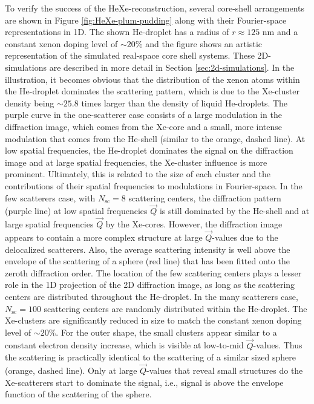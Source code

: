 To verify the success of the HeXe-reconstruction, several core-shell arrangements are shown in Figure \ref{fig:HeXe-plum-pudding} along with their Fourier-space representations in 1D. The shown He-droplet has a radius of $r\approx 125$ nm and a constant xenon doping level of $\sim 20\%$ and the figure shows an artistic representation of the simulated real-space core shell systems. These 2D-simulations are described in more detail in Section \ref{sec:2d-simulations}. In the illustration, it becomes obvious that the distribution of the xenon atoms within the He-droplet dominates the scattering pattern, which is due to the Xe-cluster density being $\sim 25.8$ times larger than the density of liquid He-droplets. The purple curve in the one-scatterer case consists of a large modulation in the diffraction image, which comes from the Xe-core and a small, more intense modulation that comes from the He-shell (similar to the orange, dashed line). At low spatial frequencies, the He-droplet dominates the signal on the diffraction image and at large spatial frequencies, the Xe-cluster influence is more prominent. Ultimately, this is related to the size of each cluster and the contributions of their spatial frequencies to modulations in Fourier-space. In the few scatterers case, with $N_{\text{sc}}=8$ scattering centers, the diffraction pattern (purple line) at low spatial frequencies $\vec{Q}$ is still dominated by the He-shell and at large spatial frequencies $\vec{Q}$ by the Xe-cores. However, the diffraction image appears to contain a more complex structure at large $\vec{Q}$-values due to the delocalized scatterers. Also, the average scattering intensity is well above the envelope of the scattering of a sphere (red line) that has been fitted onto the zeroth diffraction order. The location of the few scattering centers plays a lesser role in the 1D projection of the 2D diffraction image, as long as the scattering centers are distributed throughout the He-droplet. In the many scatterers case, $N_{\text{sc}}=100$ scattering centers are randomly distributed within the He-droplet. The Xe-clusters are significantly reduced in size to match the constant xenon doping level of $\sim 20 \%$. For the outer shape, the small clusters appear similar to a constant electron density increase, which is visible at low-to-mid $\vec{Q}$-values. Thus the scattering is practically identical to the scattering of a similar sized sphere (orange, dashed line). Only at large $\vec{Q}$-values that reveal small structures do the Xe-scatterers start to dominate the signal, i.e., signal is above the envelope function of the scattering of the sphere.\\[1\baselineskip]
